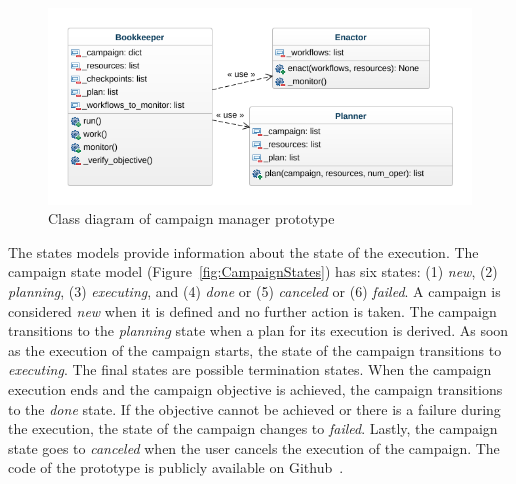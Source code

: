 \begin{figure}[t]
    \centering
    \includegraphics[width=.95\textwidth]{figures/manager/class_diagram.png}
    \caption{Class diagram of campaign manager prototype}\label{fig:rcm_class_diagram}
\end{figure}

The states models provide information about the state of the execution. The
campaign state model (Figure~\ref{fig:CampaignStates}) has six states: (1)
\textit{new}, (2) \textit{planning}, (3) \textit{executing}, and (4)
\textit{done} or (5) \textit{canceled} or (6) \textit{failed}. A campaign is
considered \textit{new} when it is defined and no further action is taken. The
campaign transitions to the \textit{planning} state when a plan for its
execution is derived. As soon as the execution of the campaign starts, the state
of the campaign transitions to \textit{executing}. The final states are possible
termination states. When the campaign execution ends and the campaign objective
is achieved, the campaign transitions to the \textit{done} state. If the
objective cannot be achieved or there is a failure during the execution, the
state of the campaign changes to \textit{failed}. Lastly, the campaign state
goes to \textit{canceled} when the user cancels the execution of the campaign.
The code of the prototype is publicly available on Github~\cite{cm_git}.

